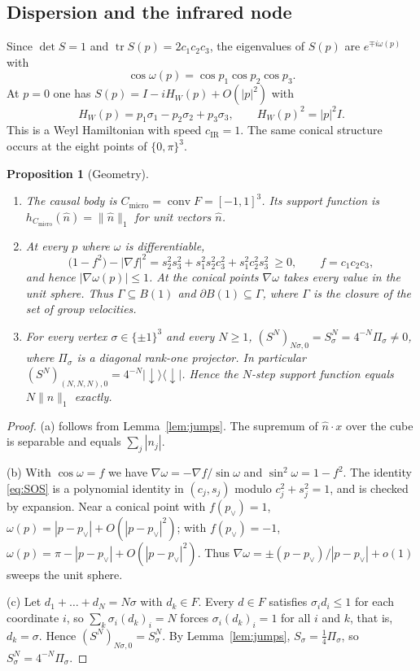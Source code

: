 \documentclass[11pt]{amsart}
\newtheorem{proposition}[theorem]{Proposition}
\theoremstyle{definition}
\theoremstyle{remark}
\newcommand{\dn}{{\downarrow}}
\newcommand{\Cmicro}{C_{\mathrm{micro}}}
\newcommand{\cIR}{c_{\mathrm{IR}}}
\newcommand{\tr}{\operatorname{tr}}
\begin{document}
\subsection{Dispersion and the infrared node}
Since $\det S=1$ and $\tr S(p)=2c_1c_2c_3$, the eigenvalues of $S(p)$ are
$e^{\mp i\omega(p)}$ with
\begin{equation}\label{eq:dispersion}
\cos\omega(p)=\cos p_1\cos p_2\cos p_3 .
\end{equation}
At $p=0$ one has $S(p)=I-iH_W(p)+O(|p|^2)$ with
\[
H_W(p)=p_1\sigma_1-p_2\sigma_2+p_3\sigma_3,\qquad H_W(p)^2=|p|^2I .
\]
This is a Weyl Hamiltonian with speed $\cIR=1$.  The same conical structure
occurs at the eight points of $\{0,\pi\}^3$.

\begin{proposition}[Geometry]\label{prop:geometry}
\begin{enumerate}[label=(\alph*)]
\item The causal body is $\Cmicro=\operatorname{conv}F=[-1,1]^3$.  Its
  support function is $h_{\Cmicro}(\hat n)=\|\hat n\|_1$ for unit vectors
  $\hat n$.
\item At every $p$ where $\omega$ is differentiable,
  \begin{equation}\label{eq:SOS}
  \bigl(1-f^2\bigr)-|\nabla f|^2=s_2^2s_3^2+s_1^2s_2^2c_3^2+s_1^2c_2^2s_3^2\ \ge0,
  \qquad f=c_1c_2c_3,
  \end{equation}
  and hence $|\nabla\omega(p)|\le1$.  At the conical points $\nabla\omega$
  takes every value in the unit sphere.  Thus $\Gamma\subseteq B(1)$ and
  $\partial B(1)\subseteq\Gamma$, where $\Gamma$ is the closure of the set
  of group velocities.
\item For every vertex $\sigma\in\{\pm1\}^3$ and every $N\ge1$,
  $(S^N)_{N\sigma,0}=S_\sigma^N=4^{-N}\Pi_\sigma\ne0$, where $\Pi_\sigma$ is
  a diagonal rank-one projector.  In particular
  $(S^N)_{(N,N,N),0}=4^{-N}|\dn\rangle\langle\dn|$.  Hence the $N$-step
  support function equals $N\|\hat n\|_1$ exactly.
\end{enumerate}
\end{proposition}

\begin{proof}
(a) follows from Lemma~\ref{lem:jumps}.  The supremum of $\hat n\cdot x$ over
the cube is separable and equals $\sum_j|n_j|$.

(b) With $\cos\omega=f$ we have $\nabla\omega=-\nabla f/\sin\omega$ and
$\sin^2\omega=1-f^2$.  The identity \eqref{eq:SOS} is a polynomial identity
in $(c_j,s_j)$ modulo $c_j^2+s_j^2=1$, and is checked by expansion.  Near a
conical point with $f(p_\vee)=1$, $\omega(p)=|p-p_\vee|+O(|p-p_\vee|^2)$;
with $f(p_\vee)=-1$, $\omega(p)=\pi-|p-p_\vee|+O(|p-p_\vee|^2)$.
Thus $\nabla\omega=\pm(p-p_\vee)/|p-p_\vee|+o(1)$ sweeps the unit sphere.

(c) Let $d_1+\dots+d_N=N\sigma$ with $d_k\in F$.  Every $d\in F$ satisfies
$\sigma_i d_i\le1$ for each coordinate $i$, so
$\sum_k\sigma_i(d_k)_i=N$ forces $\sigma_i(d_k)_i=1$ for all $i$ and $k$,
that is, $d_k=\sigma$.  Hence $(S^N)_{N\sigma,0}=S_\sigma^N$.  By Lemma~\ref{lem:jumps},
$S_\sigma=\frac14\Pi_\sigma$, so $S_\sigma^N=4^{-N}\Pi_\sigma$.
\end{proof}
\end{document}
